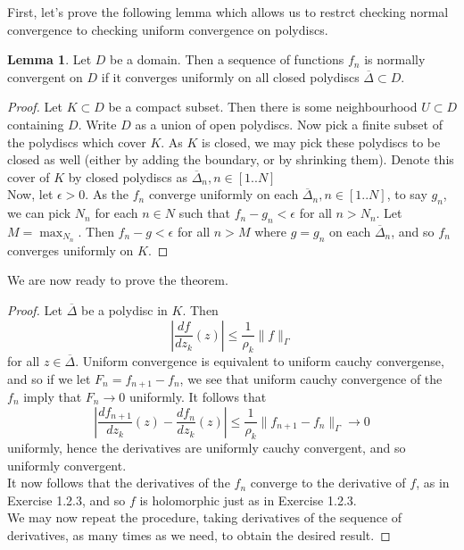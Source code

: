 \documentclass{article}
\theoremstyle{definition}
\newtheorem{lemma}[theorem]{Lemma}
\begin{document}
First, let's prove the following lemma which allows us to restrct checking normal convergence 
to checking uniform convergence on polydiscs.

\begin{lemma}
	Let $D$ be a domain. Then a sequence of functions $f_n$ is normally
	convergent on $D$ if it converges uniformly on all closed polydiscs
	$\overline{\Delta} \subset D$.
\end{lemma}
\begin{proof}
	Let $K \subset D$ be a compact subset. Then there is some neighbourhood $U
	\subset D$ containing $D$. Write $D$ as a union of open polydiscs. Now pick
	a finite subset of the polydiscs which cover $K$. As $K$ is closed, we may
	pick these polydiscs to be closed as well (either by adding the boundary,
	or by shrinking them). Denote this cover of $K$ by closed polydiscs as
	$\overline{\Delta}_n, n \in [1..N]$\\

	Now, let $\epsilon > 0$. As the $f_n$ converge uniformly on each
	$\overline{\Delta}_n, n \in [1..N]$, to say $g_n$, we can pick $N_n$ for
	each $n \in N$ such that $f_{n} - g_n < \epsilon$ for all $n > N_n$. Let $M
	= \max_{N_n}$. Then $f_n - g < \epsilon$ for all $n > M$ where $g = g_n$ on
	each $\overline{\Delta}_n$, and so $f_n$ converges uniformly on $K$.
\end{proof}

We are now ready to prove the theorem.

\begin{proof}
	Let $\overline{\Delta}$ be a polydisc in $K$. Then 
	\[
		\left|\frac{d f}{d z_k}(z)\right|
		\leq
		\frac{1}{\rho_k} \|f\|_{\Gamma}
	\]
	for all $z \in \overline{\Delta}$. Uniform convergence is equivalent to
	uniform cauchy convergense, and so if we let $F_n = f_{n + 1} - f_n$, we
	see that uniform cauchy convergence of the $f_n$ imply that $F_n
	\rightarrow 0$ uniformly. It follows that 
	\[
		\left|\frac{d f_{n + 1}}{d z_k}(z)
		-
		\frac{d f_n}{d z_k}(z)\right|
		\leq
		\frac{1}{\rho_k} \|f_{n + 1} - f_n\|_{\Gamma}
		\rightarrow
		0
	\]
	uniformly, hence the derivatives are uniformly cauchy convergent,
	and so uniformly convergent. \\

	It now follows that the derivatives of the $f_n$ converge to the 
	derivative of $f$, as in Exercise 1.2.3, and so $f$ is holomorphic
	just as in Exercise 1.2.3. \\

	We may now repeat the procedure, taking derivatives of the sequence of
	derivatives, as many times as we need, to obtain the desired result.
\end{proof}
\end{document}
